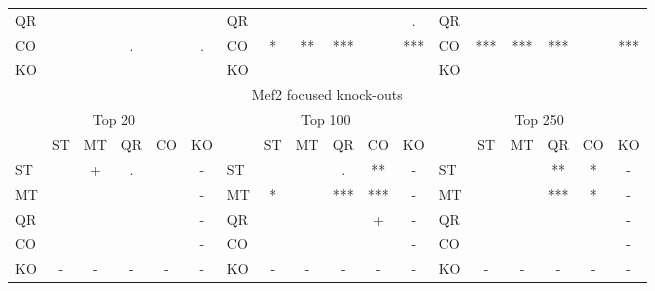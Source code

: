 \documentclass{article}
\begin{document}
\begin{longtable}[c]{lccccc|lccccc|lccccc}
QR &     &     &     &     &     & QR &     &     &     &     & .   & QR &     &     &     &     &    \\
CO &     &     & .   &     & .   & CO & *   & **  & *** &     & *** & CO & *** & *** & *** &     & ***\\
KO &     &     &     &     &     & KO &     &     &     &     &     & KO &     &     &     &     &    \\
\multicolumn{18}{c}{Mef2 focused knock-outs} \\
\multicolumn{6}{c|}{Top 20} &\multicolumn{6}{c|}{Top 100}  & \multicolumn{6}{c}{Top 250}\\
    & ST  & MT  & QR  & CO  & KO &     & ST  & MT  & QR  & CO  & KO  &     & ST  & MT  & QR  & CO  & KO \\
ST &     & +   & .   &     & -   & ST &     &     & .   & **  & -   & ST &     &     & **  & *   & -  \\
MT &     &     &     &     & -   & MT & *   &     & *** & *** & -   & MT &     &     & *** & *   & -  \\
QR &     &     &     &     & -   & QR &     &     &     & +   & -   & QR &     &     &     &     & -  \\
CO &     &     &     &     & -   & CO &     &     &     &     & -   & CO &     &     &     &     & -  \\
KO & -   & -   & -   & -   & -   & KO & -   & -   & -   & -   & -   & KO & -   & -   & -   & -   & -  \\
\end{longtable}
\end{document}
